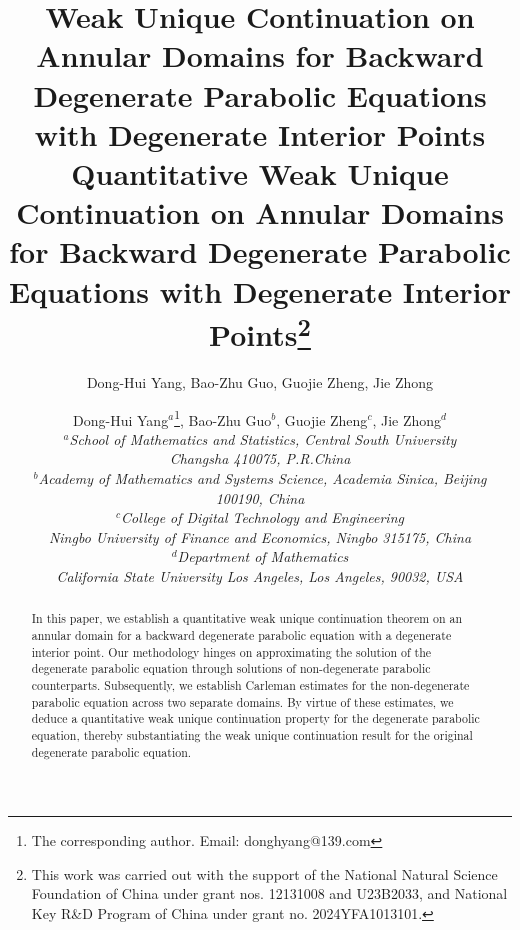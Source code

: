 \documentclass[11pt]{article}
\numberwithin{equation}{section}
\def\bf{\textbf}
\begin{document}
	
	
	\title{\bf {\bf  Weak  Unique Continuation  on Annular Domains for Backward Degenerate Parabolic Equations with Degenerate Interior Points
}}
	\author{Dong-Hui Yang, Bao-Zhu Guo, Guojie Zheng, Jie Zhong}
	
	
\title{{\bf   {\bf Quantitative   Weak  Unique Continuation  on Annular Domains for Backward Degenerate Parabolic Equations with Degenerate Interior Points}}\footnote{\small This work was carried out with the support of the
National Natural Science Foundation of China under grant  nos. 12131008 and U23B2033, and
National Key R\&D Program of China under grant no. 2024YFA1013101.}}


\author{ Dong-Hui Yang$^{a}$\footnote{\small
The corresponding author. Email: donghyang@139.com},  Bao-Zhu Guo$^{b}$, Guojie Zheng$^{c}$,  Jie Zhong$^{d}$
\\
$^a${\it School of Mathematics and Statistics, Central South University}\\
			{\it Changsha 410075, P.R.China}\\
$^b${\it Academy of Mathematics and Systems Science, Academia Sinica, Beijing 100190, China}\\
$^c${\it College of Digital Technology and Engineering}\\
 {\it Ningbo University of Finance and Economics, Ningbo 315175, China} \\
$^d${\it   Department of Mathematics}\\
{\it California State University Los Angeles, Los Angeles, 90032, USA}
}
\date{}

	
	\maketitle{}
	\thispagestyle{empty}
	\thispagestyle{empty}
	
	
	\begin{abstract}
		  In this paper, we establish  a quantitative weak unique continuation theorem on an annular domain for a backward degenerate parabolic equation with a degenerate interior point. Our methodology hinges on approximating the solution of the degenerate parabolic equation through solutions of non-degenerate parabolic counterparts. Subsequently, we establish Carleman estimates for the non-degenerate parabolic equation across two separate domains. By virtue of these estimates, we deduce a quantitative weak unique continuation property for the degenerate parabolic equation, thereby substantiating the weak unique continuation result for the original degenerate parabolic equation.
	\end{abstract}
	
\end{document}
